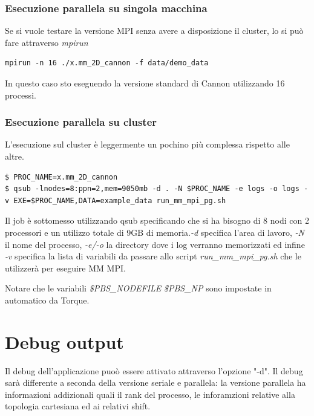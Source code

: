 \subsubsection{Esecuzione parallela su singola macchina}

Se si vuole testare la versione MPI senza avere a disposizione il cluster, lo si pu\`{o} fare attraverso \textit{mpirun}

\begin{lstlisting}
mpirun -n 16 ./x.mm_2D_cannon -f data/demo_data
\end{lstlisting}

In questo caso sto eseguendo la versione standard di Cannon utilizzando 16 processi.

\subsubsection{Esecuzione parallela su cluster}

L'esecuzione sul cluster \`{e} leggermente un pochino pi\`{u} complessa rispetto alle altre.

\begin{lstlisting}
$ PROC_NAME=x.mm_2D_cannon
$ qsub -lnodes=8:ppn=2,mem=9050mb -d . -N $PROC_NAME -e logs -o logs -v EXE=$PROC_NAME,DATA=example_data run_mm_mpi_pg.sh
\end{lstlisting}

Il job \`{e} sottomesso utilizzando qsub specificando che si ha bisogno di 8 nodi con 2 processori e un utilizzo totale di 9GB di memoria.\textit{-d} specifica l'area di lavoro, \textit{-N} il nome del processo, \textit{-e/-o} la directory dove i log verranno memorizzati ed infine \textit{-v} specifica la lista di variabili da passare allo script \textit{run\_mm\_mpi\_pg.sh} che le utilizzer\`{a} per eseguire MM MPI.



Notare che le variabili \textit{\$PBS\_NODEFILE} \textit{\$PBS\_NP} sono impostate in automatico da Torque.

\section{Debug output}

Il debug dell'applicazione puo\`{o} essere attivato attraverso l'opzione "-d". Il debug sar\`{a} differente a seconda della versione seriale e parallela: la versione parallela ha informazioni addizionali quali il rank del processo, le inforamzioni relative alla topologia cartesiana ed ai relativi shift.

